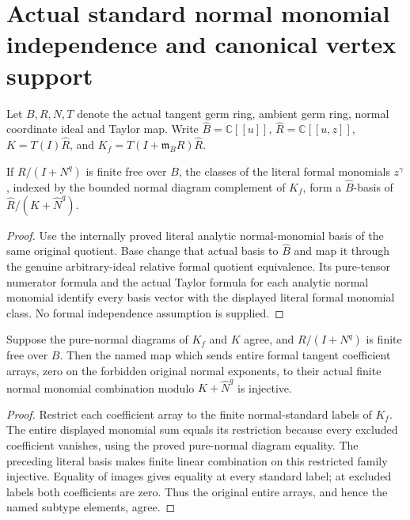 \section{Actual standard normal monomial independence and canonical vertex support}
\label{sec:hironaka-actual-standard-normal-independence}
Let $B,R,N,T$ denote the actual tangent germ ring, ambient germ ring, normal coordinate ideal and Taylor map.
Write $\widehat B=\mathbb C[[u]]$, $\widehat R=\mathbb C[[u,z]]$, $K=T(I)\widehat R$, and $K_f=T(I+\mathfrak m_B R)\widehat R$.

\begin{theorem}
\label{hir:actual-formal-normal-standard-basis}
\leanok
If $R/(I+N^q)$ is finite free over $B$, the classes of the literal formal monomials $z^\gamma$, indexed by the bounded normal diagram complement of $K_f$, form a $\widehat B$-basis of $\widehat R/(K+\widehat N^q)$.
\end{theorem}
\begin{proof}
Use the internally proved literal analytic normal-monomial basis of the same original quotient.
Base change that actual basis to $\widehat B$ and map it through the genuine arbitrary-ideal relative formal quotient equivalence.
Its pure-tensor numerator formula and the actual Taylor formula for each analytic normal monomial identify every basis vector with the displayed literal formal monomial class.
No formal independence assumption is supplied.
\end{proof}

\begin{theorem}
\label{hir:actual-normal-standard-map-injective}
\leanok
Suppose the pure-normal diagrams of $K_f$ and $K$ agree, and $R/(I+N^q)$ is finite free over $B$.
Then the named map which sends entire formal tangent coefficient arrays, zero on the forbidden original normal exponents, to their actual finite normal monomial combination modulo $K+\widehat N^q$ is injective.
\end{theorem}
\begin{proof}
Restrict each coefficient array to the finite normal-standard labels of $K_f$.
The entire displayed monomial sum equals its restriction because every excluded coefficient vanishes, using the proved pure-normal diagram equality.
The preceding literal basis makes finite linear combination on this restricted family injective.
Equality of images gives equality at every standard label; at excluded labels both coefficients are zero.
Thus the original entire arrays, and hence the named subtype elements, agree.
\end{proof}

